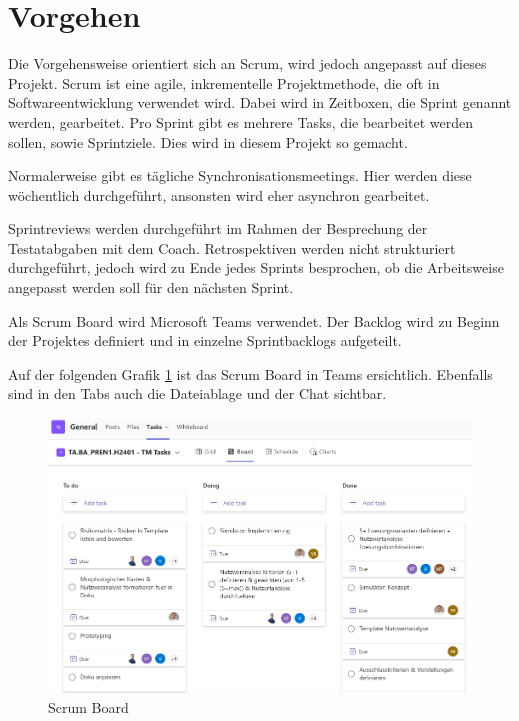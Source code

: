 \section{Vorgehen}

Die Vorgehensweise orientiert sich an Scrum, wird jedoch angepasst auf dieses Projekt.
Scrum ist eine agile, inkrementelle Projektmethode, die oft in Softwareentwicklung verwendet wird. Dabei wird in Zeitboxen, die Sprint genannt werden, gearbeitet. Pro Sprint gibt es mehrere Tasks, die bearbeitet werden sollen, sowie Sprintziele. Dies wird in diesem Projekt so gemacht.\cite{wikipedia-scrum}

Normalerweise gibt es tägliche Synchronisationsmeetings. Hier werden diese wöchentlich durchgeführt, ansonsten wird eher asynchron gearbeitet.

Sprintreviews werden durchgeführt im Rahmen der Besprechung der Testatabgaben mit dem Coach. Retrospektiven werden nicht strukturiert durchgeführt, jedoch wird zu Ende jedes Sprints besprochen, ob die Arbeitsweise angepasst werden soll für den nächsten Sprint.

Als Scrum Board wird Microsoft Teams verwendet. Der Backlog wird zu Beginn der Projektes definiert und in einzelne Sprintbacklogs aufgeteilt.

Auf der folgenden Grafik \ref{fig:scrum-board} ist das Scrum Board in Teams ersichtlich. Ebenfalls sind in den Tabs auch die Dateiablage und der Chat sichtbar.

\begin{figure}[H]
\centering
\includegraphics[width=\textwidth]{img/scrum-board.png}
\caption{Scrum Board}
\label{fig:scrum-board}
\end{figure}

